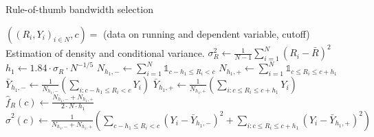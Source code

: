\documentclass[11pt, a4paper, leqno]{article}
\begin{document}
\begin{algorithm}
	\caption{Rule-of-thumb bandwidth selection}\label{alg:rot}
	\begin{algorithmic}[1]
		\Require $((R_{i}, Y_{i})_{i \in N}, c) =$ (data on running and dependent variable, cutoff)
		\Stepone Estimation of density and conditional variance.
		\State $\sigma^{2}_{R} \gets \frac{1}{N-1} \sum_{i=1}^{N} (R_{i} - \bar{R})^{2}$
		\State $h_{1} \gets 1.84 \cdot \sigma_{R} \cdot N^{-1/5}$
		\State $N_{h_{1}, -} \gets \sum_{i=1}^{N} \mathds{1}_{c-h_{1} \leq R_{i} < c}$
		\State $N_{h_{1}, +} \gets \sum_{i=1}^{N} \mathds{1}_{c \leq R_{i} \leq c+h_{1}}$
		\State $\bar{Y}_{h_{1}, -} \gets \frac{1}{N_{h_{1}, -}} \left(\sum_{i: c-h_{1} \leq R_{i} < c} Y_{i} \right)$
		\State $\bar{Y}_{h_{1}, +} \gets \frac{1}{N_{h_{1}, +}} \left(\sum_{i: c \leq R_{i} \leq c+h_{1}} Y_{i} \right)$
		\State $\widehat{f}_{R}(c) \gets \frac{N_{h_{1}, -} + N_{h_{1}, +}}{2 \cdot N \cdot h_{1}}$ {\color{blue} }
		\State $\widehat{\sigma}^{2}(c) \gets \frac{1}{N_{h_{1}, -} + N_{h_{1}, +}} \left( \sum_{c-h_{1} \leq R_{i} < c} \left( Y_{i} - \bar{Y}_{h_{1}, -}\right)^{2} + \sum_{i: c \leq R_{i} \leq c+h_{1}} \left( Y_{i} - \bar{Y}_{h_{1}, +} \right)^{2} \right)$


\end{algorithmic}
\end{algorithm}
\end{document}
